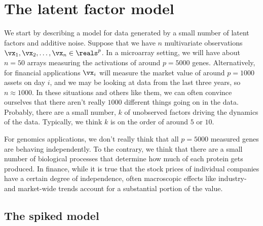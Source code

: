 \section{The latent factor model}\label{S:latent-factor-model}

We start by describing a model for data generated by a small number of latent
factors and additive noise. Suppose that we have $n$ multivariate observations
$\vx_{1}, \vx_{2}, \ldots, \vx_{n} \in \reals^p$. In a microarray setting, we
will have about $n=50$ arrays measuring the activations of around $p=5000$
genes. Alternatively, for financial applications $\vx_i$ will measure the
market value of around $p=1000$ assets on day $i$, and we may be looking at
data from the last three years, so $n \approx 1000$. In these situations and
others like them, we can often convince ourselves that there aren't really
$1000$ different things going on in the data. Probably, there are a small
number, $k$ of unobserved factors driving the dynamics of the data. Typically,
we think $k$ is on the order of around $5$ or $10$.

For genomics applications, we don't really think that all $p=5000$ measured
genes are behaving independently. To the contrary, we think that there are a
small number of biological processes that determine how much of each protein
gets produced. In finance, while it is true that the stock prices of
individual companies have a certain degree of independence, often macroscopic
effects like industry- and market-wide trends account for a substantial
portion of the value.

\subsection{The spiked model}

